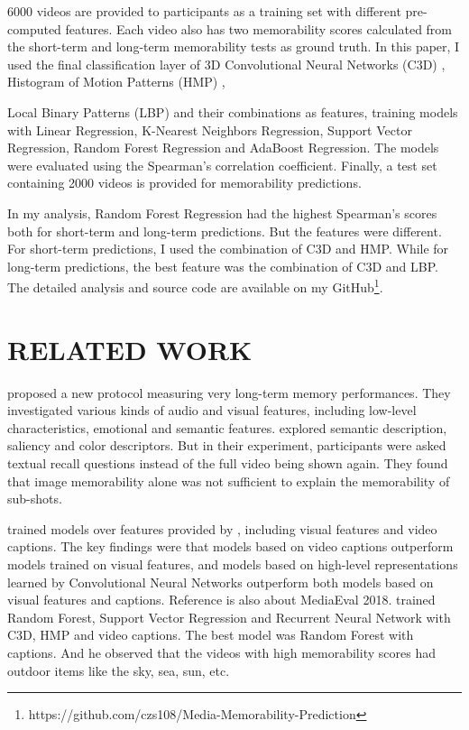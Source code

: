 \documentclass[conference, compsoc]{IEEEtran}
\begin{document}
6000 videos are provided to participants as a training set with different pre-computed features.
Each video also has two memorability scores calculated from the short-term and long-term memorability tests as ground truth.
In this paper, I used the final classification layer of 3D Convolutional Neural Networks (C3D) \cite{DBLP:journals/corr/TranBFTP14}, Histogram of Motion Patterns (HMP) \cite{6116516}, {Local Binary Patterns (LBP) \cite{572934} and their combinations as features,
training models with Linear Regression, K-Nearest Neighbors Regression, Support Vector Regression, Random Forest Regression and AdaBoost Regression.
The models were evaluated using the Spearman's correlation coefficient.
Finally, a test set containing 2000 videos is provided for memorability predictions.

In my analysis, Random Forest Regression had the highest Spearman's scores both for short-term and long-term predictions.
But the features were different.
For short-term predictions, I used the combination of C3D and HMP.
While for long-term predictions, the best feature was the combination of C3D and LBP.
The detailed analysis and source code are available on my GitHub\footnote{https://github.com/czs108/Media-Memorability-Prediction}.


\section{RELATED WORK}
\citeauthor{10.1145/3206025.3206056} \cite{10.1145/3206025.3206056} proposed a new protocol measuring very long-term memory performances.
They investigated various kinds of audio and visual features,
including low-level characteristics, emotional and semantic features.
\citeauthor{DBLP:journals/corr/ShekharSSKS17} \cite{DBLP:journals/corr/ShekharSSKS17} explored semantic description, saliency and color descriptors.
But in their experiment, participants were asked textual recall questions instead of the full video being shown again.
They found that image memorability alone was not sufficient to explain the memorability of sub-shots.

\citeauthor{Gupta2018LinearMF} \cite{Gupta2018LinearMF} trained models over features provided by \cite{DBLP:journals/corr/abs-1807-01052},
including visual features and video captions.
The key findings were that models based on video captions outperform models trained on visual features,
and models based on high-level representations learned by Convolutional Neural Networks outperform both models based on visual features and captions.
Reference \cite{RajSingh-1994} is also about MediaEval 2018.
\citeauthor{RajSingh-1994} trained Random Forest, Support Vector Regression and Recurrent Neural Network with C3D, HMP and video captions.
The best model was Random Forest with captions.
And he observed that the videos with high memorability scores had outdoor items like the sky, sea, sun, etc.


}
\end{document}
